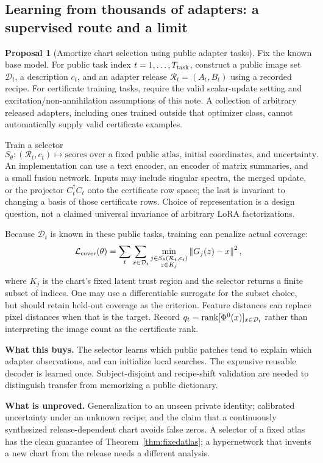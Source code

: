 \documentclass[11pt,a4paper]{article}
\theoremstyle{definition}
\theoremstyle{definition}
\newtheorem{proposal}[theorem]{Proposal}
\theoremstyle{remark}\newtheorem{remark}[theorem]{Remark}
\newcommand{\norm}[1]{\left\lVert #1\right\rVert}
\begin{document}
\subsection{Learning from thousands of adapters: a supervised route and a limit}

\begin{proposal}[Amortize chart selection using public adapter tasks]\label{pr:meta}
Fix the known base model. For public task index $t=1,\ldots,T_{\rm task}$, construct a public image set $\mathcal D_t$, a description $c_t$, and an adapter release $\mathcal R_t=(A_t,B_t)$ using a recorded recipe. For certificate training tasks, require the valid scalar-update setting and excitation/non-annihilation assumptions of this note. A collection of arbitrary released adapters, including ones trained outside that optimizer class, cannot automatically supply valid certificate examples.

Train a selector
\[
S_\theta:(\mathcal R_t,c_t)\longmapsto
\text{scores over a fixed public atlas, initial coordinates, and uncertainty}.
\]
An implementation can use a text encoder, an encoder of matrix summaries, and a small fusion network. Inputs may include singular spectra, the merged update, or the projector $C_t^\dagger C_t$ onto the certificate row space; the last is invariant to changing a basis of those certificate rows. Choice of representation is a design question, not a claimed universal invariance of arbitrary LoRA factorizations.

Because $\mathcal D_t$ is known in these public tasks, training can penalize actual coverage:
\[
\mathcal L_{\rm cover}(\theta)
=\sum_t\sum_{x\in\mathcal D_t}
\min_{\substack{j\in S_\theta(\mathcal R_t,c_t)\\ z\in K_j}}
\norm{G_j(z)-x}^2,
\]
where $K_j$ is the chart's fixed latent trust region and the selector returns a finite subset of indices. One may use a differentiable surrogate for the subset choice, but should retain held-out coverage as the criterion. Feature distances can replace pixel distances when that is the target. Record $q_t=\operatorname{rank}[\Phi^0(x)]_{x\in\mathcal D_t}$ rather than interpreting the image count as the certificate rank.

\textbf{What this buys.} The selector learns which public patches tend to explain which adapter observations, and can initialize local searches. The expensive reusable decoder is learned once. Subject-disjoint and recipe-shift validation are needed to distinguish transfer from memorizing a public dictionary.

\textbf{What is unproved.} Generalization to an unseen private identity; calibrated uncertainty under an unknown recipe; and the claim that a continuously synthesized release-dependent chart avoids false zeros. A selector of a fixed atlas has the clean guarantee of Theorem~\ref{thm:fixedatlas}; a hypernetwork that invents a new chart from the release needs a different analysis.
\end{proposal}
\end{document}
